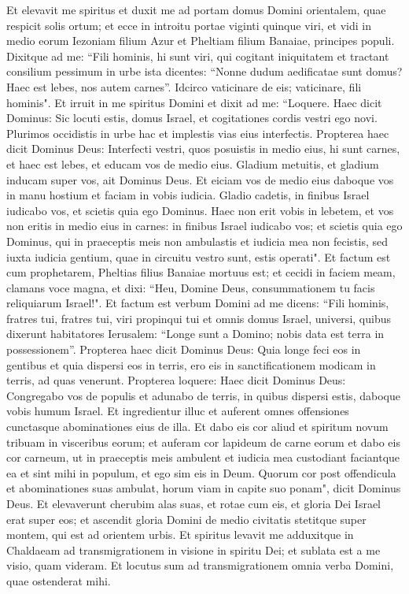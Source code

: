\begin{biblechapter}  
\verse Et elevavit me spiritus et duxit me ad portam domus Domini orientalem, quae respicit solis ortum; et ecce in introitu portae viginti quinque viri, et vidi in medio eorum Iezoniam filium Azur et Pheltiam filium Banaiae, principes populi. 
\verse Dixitque ad me: “Fili hominis, hi sunt viri, qui cogitant iniquitatem et tractant consilium pessimum in urbe ista 
\verse dicentes: “Nonne dudum aedificatae sunt domus? Haec est lebes, nos autem carnes”. 
\verse Idcirco vaticinare de eis; vaticinare, fili hominis". 
\verse Et irruit in me spiritus Domini et dixit ad me: “Loquere. Haec dicit Dominus: Sic locuti estis, domus Israel, et cogitationes cordis vestri ego novi. 
\verse Plurimos occidistis in urbe hac et implestis vias eius interfectis. 
\verse Propterea haec dicit Dominus Deus: Interfecti vestri, quos posuistis in medio eius, hi sunt carnes, et haec est lebes, et educam vos de medio eius. 
\verse Gladium metuitis, et gladium inducam super vos, ait Dominus Deus. 
\verse Et eiciam vos de medio eius daboque vos in manu hostium et faciam in vobis iudicia. 
\verse Gladio cadetis, in finibus Israel iudicabo vos, et scietis quia ego Dominus. 
\verse Haec non erit vobis in lebetem, et vos non eritis in medio eius in carnes: in finibus Israel iudicabo vos; 
\verse et scietis quia ego Dominus, qui in praeceptis meis non ambulastis et iudicia mea non fecistis, sed iuxta iudicia gentium, quae in circuitu vestro sunt, estis operati". 
\verse Et factum est cum prophetarem, Pheltias filius Banaiae mortuus est; et cecidi in faciem meam, clamans voce magna, et dixi: “Heu, Domine Deus, consummationem tu facis reliquiarum Israel!". 
\verse Et factum est verbum Domini ad me dicens: 
\verse “Fili hominis, fratres tui, fratres tui, viri propinqui tui et omnis domus Israel, universi, quibus dixerunt habitatores Ierusalem: “Longe sunt a Domino; nobis data est terra in possessionem”. 
\verse Propterea haec dicit Dominus Deus: Quia longe feci eos in gentibus et quia dispersi eos in terris, ero eis in sanctificationem modicam in terris, ad quas venerunt. 
\verse Propterea loquere: Haec dicit Dominus Deus: Congregabo vos de populis et adunabo de terris, in quibus dispersi estis, daboque vobis humum Israel. 
\verse Et ingredientur illuc et auferent omnes offensiones cunctasque abominationes eius de illa. 
\verse Et dabo eis cor aliud et spiritum novum tribuam in visceribus eorum; et auferam cor lapideum de carne eorum et dabo eis cor carneum, 
\verse ut in praeceptis meis ambulent et iudicia mea custodiant faciantque ea et sint mihi in populum, et ego sim eis in Deum.  
\verse Quorum cor post offendicula et abominationes suas ambulat, horum viam in capite suo ponam", dicit Dominus Deus. 
\verse Et elevaverunt cherubim alas suas, et rotae cum eis, et gloria Dei Israel erat super eos; 
\verse et ascendit gloria Domini de medio civitatis stetitque super montem, qui est ad orientem urbis. 
\verse Et spiritus levavit me adduxitque in Chaldaeam ad transmigrationem in visione in spiritu Dei; et sublata est a me visio, quam videram. 
\verse Et locutus sum ad transmigrationem omnia verba Domini, quae ostenderat mihi. 
\end{biblechapter}

